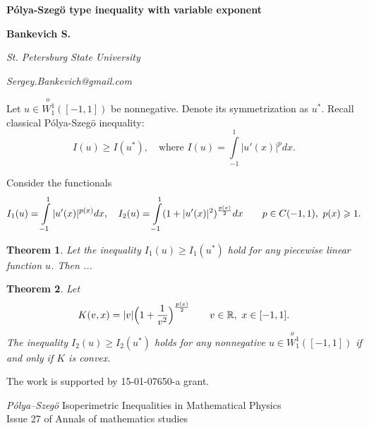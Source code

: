 \documentclass[12pt]{article}
\newtheorem{thm}{Theorem}
\newcommand{\Wf}{\stackrel{o\ }{W_1^1}}
\newcommand{\Real}{\mathbb R}
\renewcommand{\ge}{\geqslant}
\begin{document}
\centerline{\large\bf P\'olya-Szeg\"o type inequality with variable exponent}
\medskip
\centerline{\bf Bankevich S.}
\medskip
\centerline{\it St. Petersburg State University}
\centerline{\it Sergey.Bankevich@gmail.com}
\bigskip

Let $u \in \Wf([-1,1])$ be nonnegative.
Denote its symmetrization as $u^*$.
Recall classical P\'olya-Szeg\"o \cite{PS} inequality:
\begin{equation}
\label{ineq}
I(u) \ge I(u^*), \quad \mbox{where } I(u) = \int\limits_{-1}^1 |u'(x)|^p dx.
\end{equation}

Consider the functionals
\begin{equation}
I_1(u) = \int\limits_{-1}^1 |u'(x)|^{p(x)} dx, \quad
I_2(u) = \int\limits_{-1}^1 ( 1 + |u'(x)|^2 )^{p(x) \over 2} dx \qquad
p \in C(-1, 1),\ p(x) \ge 1.
\end{equation}

\begin{thm}
Let the inequality $I_1(u) \ge I_1(u^*)$ hold for any piecewise linear function $u$.
Then ...
\end{thm}

\begin{thm}
Let
$$K(v, x) = |v| \Big(1 + {1 \over v^2}\Big)^{p(x) \over 2} \qquad v \in \Real,\ x \in [-1, 1].$$
The inequality $I_2(u) \ge I_2(u^*)$ holds for any nonnegative $u \in \Wf([-1, 1])$ if and only if $K$ is convex.
\end{thm}

The work is supported by 15-01-07650-a grant.

\begin{thebibliography}{100}
 {\it P\'olya--Szeg\"o}
Isoperimetric Inequalities in Mathematical Physics
\\ Issue 27 of Annals of mathematics studies
\end{thebibliography}
\end{document}
